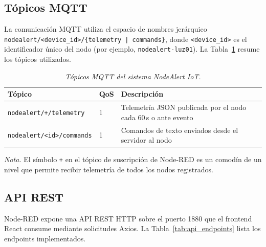 \subsection{Tópicos MQTT}

La comunicación MQTT utiliza el espacio de nombres jerárquico
\texttt{nodealert/<device\_id>/\{telemetry | commands\}}, donde
\texttt{<device\_id>} es el identificador único del nodo (por ejemplo,
\texttt{nodealert-luz01}). La Tabla~\ref{tab:mqtt_topics} resume los tópicos
utilizados.

\begin{table}[htbp]
  \caption{\textit{Tópicos MQTT del sistema NodeAlert IoT.}}
  \label{tab:mqtt_topics}
  \centering
  \small
  \begin{tabularx}{\textwidth}{@{}llX@{}}
    \toprule
    \textbf{Tópico} & \textbf{QoS} & \textbf{Descripción} \\
    \midrule
    \texttt{nodealert/+/telemetry} & 1 & Telemetría JSON publicada por el nodo cada 60\,s o ante evento \\
    \texttt{nodealert/<id>/commands} & 1 & Comandos de texto enviados desde el servidor al nodo \\
    \bottomrule
  \end{tabularx}
  \vspace{4pt}

  \noindent\textit{Nota.} El símbolo \texttt{+} en el tópico de suscripción de Node-RED es
  un comodín de un nivel que permite recibir telemetría de todos los nodos registrados.
\end{table}

\subsection{API REST}

Node-RED expone una API REST HTTP sobre el puerto 1880 que el frontend React consume
mediante solicitudes Axios. La Tabla~\ref{tab:api_endpoints} lista los endpoints
implementados.

